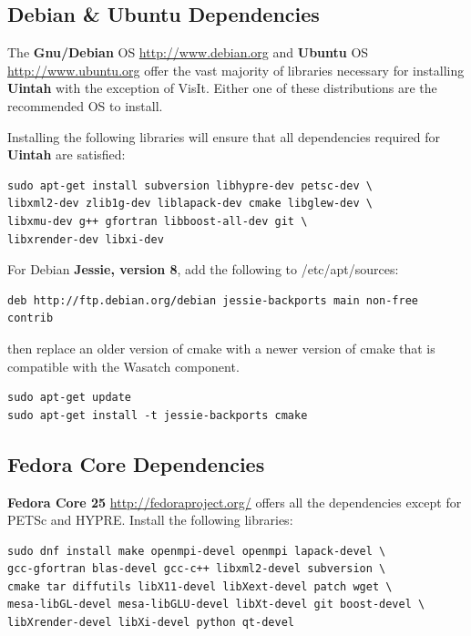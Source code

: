 \documentclass[12pt]{article}
\begin{document}
\subsection{Debian \& Ubuntu Dependencies}
\label{sec:debian_dependencies}
The \textbf{Gnu/Debian} OS \url{http://www.debian.org} and
\textbf{Ubuntu} OS \url{http://www.ubuntu.org} offer the vast majority
of libraries necessary for installing \textbf{Uintah} with the
exception of VisIt.  Either one of these distributions are
the recommended OS to install.

Installing the following libraries will ensure that all dependencies
required for \textbf{Uintah} are satisfied:

\begin{verbatim} 
sudo apt-get install subversion libhypre-dev petsc-dev \ 
libxml2-dev zlib1g-dev liblapack-dev cmake libglew-dev \
libxmu-dev g++ gfortran libboost-all-dev git \
libxrender-dev libxi-dev
\end{verbatim}

For Debian \textbf{Jessie, version 8}, add the following to
/etc/apt/sources:

\begin{verbatim}
deb http://ftp.debian.org/debian jessie-backports main non-free
contrib
\end{verbatim}

\noindent
then replace an older version of cmake with a newer version of cmake
that is compatible with the Wasatch component. 

\begin{verbatim}
sudo apt-get update
sudo apt-get install -t jessie-backports cmake
\end{verbatim}



\subsection{Fedora Core  Dependencies}

\textbf{Fedora Core 25} \url{http://fedoraproject.org/} offers all the
dependencies except for PETSc and HYPRE.  Install the following
libraries:

\begin{verbatim}
sudo dnf install make openmpi-devel openmpi lapack-devel \
gcc-gfortran blas-devel gcc-c++ libxml2-devel subversion \ 
cmake tar diffutils libX11-devel libXext-devel patch wget \
mesa-libGL-devel mesa-libGLU-devel libXt-devel git boost-devel \
libXrender-devel libXi-devel python qt-devel
\end{verbatim} 
\end{document}
